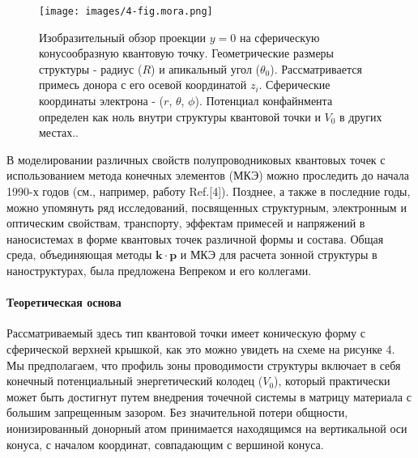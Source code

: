 \documentclass[a4paper,14pt]{extarticle}
\begin{document}
\begin{figure}[htbp]
    \centering
    \texttt{[image: images/4-fig.mora.png]}
    \caption{\label{fig:mora1} Изобразительный обзор проекции $y = 0$ на сферическую конусообразную квантовую точку. Геометрические размеры структуры - радиус ($R$) и апикальный угол ($\theta_0$). Рассматривается примесь донора с его осевой координатой $z_i$. Сферические координаты электрона - ($r$, $\theta$, $\phi$). Потенциал конфайнмента определен как ноль внутри структуры квантовой точки и $V_0$ в других местах.\cite{mora}.}
\end{figure}

В моделировании различных свойств полупроводниковых квантовых точек с использованием метода конечных элементов (МКЭ) можно проследить до начала 1990-х годов (см., например, работу Ref.[4]). Позднее, а также в последние годы, можно упомянуть ряд исследований, посвященных структурным, электронным и оптическим свойствам, транспорту, эффектам примесей и напряжений в наносистемах в форме квантовых точек различной формы и состава. Общая среда, объединяющая методы $\mathbf{k} \cdot \mathbf{p}$ и МКЭ для расчета зонной структуры в наноструктурах, была предложена Вепреком и его коллегами.

\paragraph{Теоретическая основа}

Рассматриваемый здесь тип квантовой точки имеет коническую форму с сферической верхней крышкой, как это можно увидеть на схеме на рисунке 4. Мы предполагаем, что профиль зоны проводимости структуры включает в себя конечный потенциальный энергетический колодец ($V_0$), который практически может быть достигнут путем внедрения точечной системы в матрицу материала с большим запрещенным зазором. Без значительной потери общности, ионизированный донорный атом принимается находящимся на вертикальной оси конуса, с началом координат, совпадающим с вершиной конуса.
\end{document}
